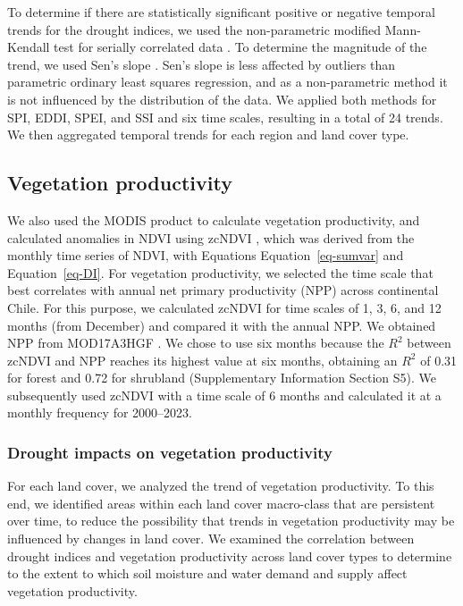 \documentclass[
  sn-nature,
  numbered]{sn-jnl}
\begin{document}
To determine if there are statistically significant positive or negative
temporal trends for the drought indices, we used the non-parametric
modified Mann-Kendall test for serially correlated data \citep{Yue2004}.
To determine the magnitude of the trend, we used Sen's slope
\citep{Sen1968}. Sen's slope is less affected by outliers than
parametric ordinary least squares regression, and as a non-parametric
method it is not influenced by the distribution of the data. We applied
both methods for SPI, EDDI, SPEI, and SSI and six time scales, resulting
in a total of 24 trends. We then aggregated temporal trends for each
region and land cover type.

\subsection{Vegetation productivity}\label{vegetation-productivity}

We also used the MODIS product to calculate vegetation productivity, and
calculated anomalies in NDVI using zcNDVI \citep{Zambrano2018}, which
was derived from the monthly time series of NDVI, with Equations
Equation~\ref{eq-sumvar} and Equation~\ref{eq-DI}. For vegetation
productivity, we selected the time scale that best correlates with
annual net primary productivity (NPP) across continental Chile. For this
purpose, we calculated zcNDVI for time scales of 1, 3, 6, and 12 months
(from December) and compared it with the annual NPP. We obtained NPP
from MOD17A3HGF \citep{Running2019}. We chose to use six months because
the \(R^2\) between zcNDVI and NPP reaches its highest value at six
months, obtaining an \(R^2\) of 0.31 for forest and 0.72 for shrubland
(Supplementary Information Section S5). We subsequently used zcNDVI with
a time scale of 6 months and calculated it at a monthly frequency for
2000--2023.

\subsubsection{Drought impacts on vegetation
productivity}\label{drought-impacts-on-vegetation-productivity}

For each land cover, we analyzed the trend of vegetation productivity.
To this end, we identified areas within each land cover macro-class that
are persistent over time, to reduce the possibility that trends in
vegetation productivity may be influenced by changes in land cover. We
examined the correlation between drought indices and vegetation
productivity across land cover types to determine to the extent to which
soil moisture and water demand and supply affect vegetation
productivity.
\end{document}

